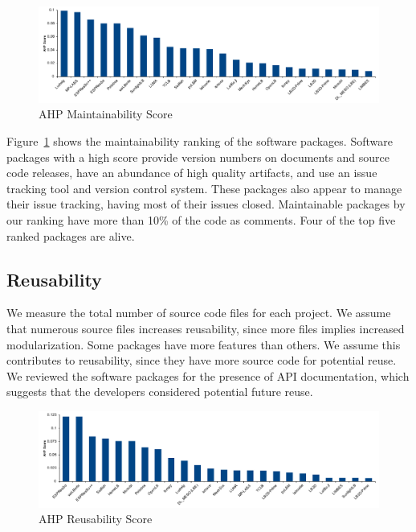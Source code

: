 \documentclass[final, 3p, times, authoryear]{elsarticle}
\begin{document}
\begin{figure}[h!]
	\begin{center}
		\includegraphics[width=1.0\textwidth]{./figures/maintainability_chart.pdf}
		\caption{AHP Maintainability Score}
		\label{Fig_Maintainability}
	\end{center}
\end{figure}

Figure~\ref{Fig_Maintainability} shows the maintainability ranking of the
software packages. Software packages with a high score provide version numbers
on documents and source code releases, have an abundance of high quality
artifacts, and use an issue tracking tool and version control system. These
packages also appear to manage their issue tracking, having most of their issues
closed. Maintainable packages by our ranking have more than 10\% of the code as
comments. Four of the top five ranked packages are alive.

\subsection{Reusability} \label{reusabilityresults}

We measure the total number of source code files for each project. We assume
that numerous source files increases reusability, since more files implies
increased modularization. Some packages have more features than others.  We
assume this contributes to reusability, since they have more source code for
potential reuse. We reviewed the software packages for the presence of API
documentation, which suggests that the developers considered potential future
reuse. 

\begin{figure}[h!]
	\begin{center}
		\includegraphics[width=1.0\textwidth]{./figures/reusability_chart.pdf}
		\caption{AHP Reusability Score}
		\label{Fig_Reusabilty}
	\end{center}
\end{figure}
\end{document}
